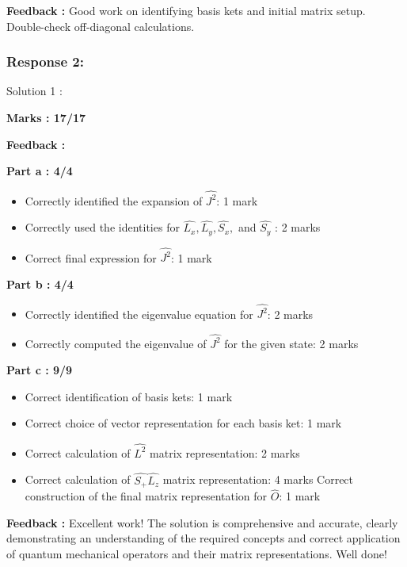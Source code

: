 \documentclass[a4paper,11pt]{article}
\begin{document}
\textbf{Feedback :}
Good work on identifying basis kets and initial matrix setup. Double-check off-diagonal calculations.



\subsubsection*{Response 2:}


Solution 1 :

\textbf{Marks : 17/17}

\textbf{Feedback : }

\textbf{Part a : 4/4}

\begin{itemize}
    \item Correctly identified the expansion of $\hat{J^2}$: 1 mark
    \item Correctly used the identities for $\hat{L_x}, \hat{L_y}, \hat{S_x},$ and $\hat{S_y}$ : 2 marks
    \item Correct final expression for $\hat{J^2}$: 1 mark
\end{itemize}


\textbf{Part b : 4/4}

\begin{itemize}
    \item Correctly identified the eigenvalue equation for $\hat{J^2}$: 2 marks
    \item Correctly computed the eigenvalue of $\hat{J^2}$ for the given state: 2 marks
\end{itemize}


\textbf{Part c : 9/9}

\begin{itemize}
    \item Correct identification of basis kets: 1 mark
    \item Correct choice of vector representation for each basis ket: 1 mark
    \item Correct calculation of $\hat{L^2}$ matrix representation: 2 marks
    \item Correct calculation of $\hat{S_+}\hat{L_z}$ matrix representation: 4 marks
    Correct construction of the final matrix representation for $\hat{O}$: 1 mark
\end{itemize}

\textbf{Feedback :}
Excellent work! The solution is comprehensive and accurate, clearly demonstrating an understanding of the required concepts and correct application of quantum mechanical operators and their matrix representations. Well done!
\end{document}
